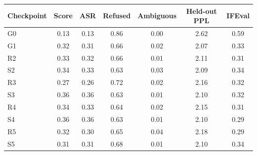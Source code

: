 \begin{tabular}{lcccccc}
\toprule
Checkpoint & Score & ASR & Refused & Ambiguous & Held-out PPL & IFEval \\
\midrule
G0 & 0.13 & 0.13 & 0.86 & 0.00 & 2.62 & 0.59 \\
G1 & 0.32 & 0.31 & 0.66 & 0.02 & 2.07 & 0.33 \\
R2 & 0.33 & 0.32 & 0.66 & 0.01 & 2.11 & 0.31 \\
S2 & 0.34 & 0.33 & 0.63 & 0.03 & 2.09 & 0.34 \\
R3 & 0.27 & 0.26 & 0.72 & 0.02 & 2.16 & 0.32 \\
S3 & 0.36 & 0.36 & 0.63 & 0.01 & 2.10 & 0.32 \\
R4 & 0.34 & 0.33 & 0.64 & 0.02 & 2.15 & 0.31 \\
S4 & 0.36 & 0.36 & 0.63 & 0.01 & 2.10 & 0.29 \\
R5 & 0.32 & 0.30 & 0.65 & 0.04 & 2.18 & 0.29 \\
S5 & 0.31 & 0.31 & 0.68 & 0.01 & 2.10 & 0.34 \\
\bottomrule
\end{tabular}
